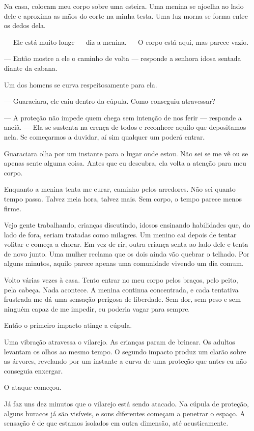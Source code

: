 Na casa, colocam meu corpo sobre uma esteira. Uma menina se ajoelha ao lado dele e aproxima as mãos do corte na minha testa. Uma luz morna se forma entre os dedos dela.

— Ele está muito longe — diz a menina. — O corpo está aqui, mas parece vazio.

— Então mostre a ele o caminho de volta — responde a senhora idosa sentada diante da cabana.

Um dos homens se curva respeitosamente para ela.

— Guaraciara, ele caiu dentro da cúpula. Como conseguiu atravessar?

— A proteção não impede quem chega sem intenção de nos ferir — responde a anciã. — Ela se sustenta na crença de todos e reconhece aquilo que depositamos nela. Se começarmos a duvidar, aí sim qualquer um poderá entrar.

Guaraciara olha por um instante para o lugar onde estou. Não sei se me vê ou se apenas sente alguma coisa. Antes que eu descubra, ela volta a atenção para meu corpo.

Enquanto a menina tenta me curar, caminho pelos arredores. Não sei quanto tempo passa. Talvez meia hora, talvez mais. Sem corpo, o tempo parece menos firme.

Vejo gente trabalhando, crianças discutindo, idosos ensinando habilidades que, do lado de fora, seriam tratadas como milagres. Um menino cai depois de tentar volitar e começa a chorar. Em vez de rir, outra criança senta ao lado dele e tenta de novo junto. Uma mulher reclama que os dois ainda vão quebrar o telhado. Por alguns minutos, aquilo parece apenas uma comunidade vivendo um dia comum.

Volto várias vezes à casa. Tento entrar no meu corpo pelos braços, pelo peito, pela cabeça. Nada acontece. A menina continua concentrada, e cada tentativa frustrada me dá uma sensação perigosa de liberdade. Sem dor, sem peso e sem ninguém capaz de me impedir, eu poderia vagar para sempre.

Então o primeiro impacto atinge a cúpula.

Uma vibração atravessa o vilarejo. As crianças param de brincar. Os adultos levantam os olhos ao mesmo tempo. O segundo impacto produz um clarão sobre as árvores, revelando por um instante a curva de uma proteção que antes eu não conseguia enxergar.

O ataque começou.

Já faz uns dez minutos que o vilarejo está sendo atacado.
Na cúpula de proteção, alguns buracos já são visíveis, e sons diferentes começam a penetrar o espaço.  
A sensação é de que estamos isolados em outra dimensão, até acusticamente.

